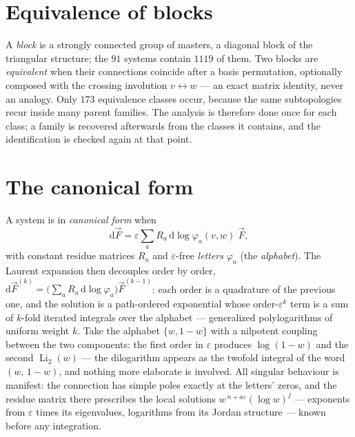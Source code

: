 \documentclass[11pt]{article}
\newcommand{\eps}{\varepsilon}
\newcommand{\dd}{\mathrm{d}}
\begin{document}
\section{Equivalence of blocks}
A \emph{block} is a strongly connected group of masters, a diagonal
block of the triangular structure; the $91$ systems contain $1119$
of them.  Two blocks are \emph{equivalent} when their connections
coincide after a basis permutation, optionally composed with the
crossing involution $v \leftrightarrow w$ --- an exact matrix
identity, never an analogy.  Only $173$ equivalence classes occur,
because the same subtopologies recur inside many parent families.
The analysis is therefore done once for each class; a family is
recovered afterwards from the classes it contains, and the
identification is checked again at that point.

\section{The canonical form}
A system is in \emph{canonical form} when
\begin{equation}
  \dd \vec F = \eps \sum_a R_a\, \dd\log \varphi_a(v,w)\;\vec F ,
\end{equation}
with constant residue matrices $R_a$ and $\eps$-free \emph{letters}
$\varphi_a$ (the \emph{alphabet}).  The Laurent expansion then
decouples order by order,
$\dd\vec F^{(k)} = \big(\sum_a R_a\,\dd\log\varphi_a\big)\vec
F^{(k-1)}$: each order is a quadrature of the previous one, and the
solution is a path-ordered exponential whose order-$\eps^k$ term is
a sum of $k$-fold iterated integrals over the alphabet ---
generalized polylogarithms of uniform weight $k$.  Take the
alphabet $\{w, 1-w\}$ with a nilpotent coupling between the two
components: the first order in $\eps$ produces $\log(1-w)$ and the
second $\operatorname{Li}_2(w)$ --- the dilogarithm appears as the
twofold integral of the word $(w,\,1{-}w)$, and nothing more
elaborate is involved.  All singular behaviour is manifest: the
connection has simple poles exactly at the letters' zeros, and the
residue matrix there prescribes the local solutions
$w^{\,n+a\eps}(\log w)^j$ --- exponents from $\eps$ times its
eigenvalues, logarithms from its Jordan structure --- known before
any integration.
\end{document}
